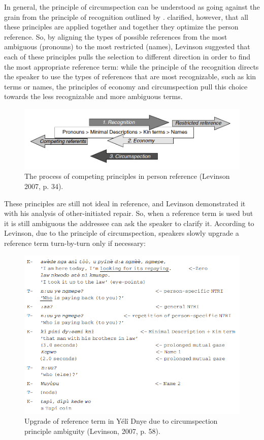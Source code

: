 \documentclass[12pt, draft]{article}
\begin{document}
In general, the principle of circumspection can be understood as going against the grain from the principle of recognition outlined by \textcite{sacks1979}. \textcite{levinson2007} clarified, however, that all these principles are applied together and together they optimize the person reference. So, by aligning the types of possible references from the most ambiguous (pronouns) to the most restricted (names), Levinson suggested that each of these principles pulls the selection to different direction in order to find the most appropriate reference term: while the principle of the recognition directs the speaker to use the types of references that are most recognizable, such as kin terms or names, the principles of economy and circumspection pull this choice towards the less recognizable and more ambiguous terms.
\begin{figure}[h]
\caption{The process of competing principles in person reference (Levinson 2007, p. 34).}
\label{chart}
\includegraphics[width=7in]{chart.png}
\end{figure}
These principles are still not ideal in reference, and Levinson demonstrated it with his analysis of other-initiated repair. So, when a reference term is used but it is still ambiguous the addressee can ask the speaker to clarify it. According to Levinson, due to the principle of circumspection, speakers slowly upgrade a reference term turn-by-turn only if necessary:
\begin{figure}[h]
\caption{Upgrade of reference term in Yélî Dnye due to circumspection principle ambiguity (Levinson, 2007, p. 58).}
\label{levinson}
\includegraphics[width=7in]{levinson.png}
\end{figure}
\end{document}
